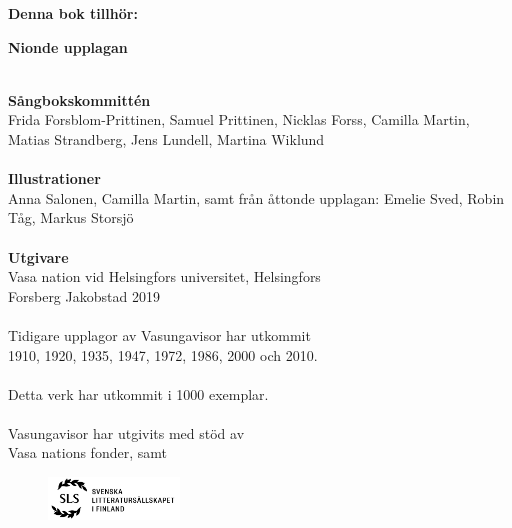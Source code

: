 
\begin{small}
\begin{center}
	\textbf{Denna bok tillhör:}
\end{center}
\end{small}
\vspace{0.5cm}
\hrulefill
\newpage
\begin{scriptsize}
\begin{center}
\textbf{Nionde upplagan}
~\\
~\\
{
\textbf{Sångbokskommittén}
~\\
Frida Forsblom-Prittinen, Samuel Prittinen, 
Nicklas Forss, Camilla Martin, Matias Strandberg,
Jens Lundell, Martina Wiklund
~\\
~\\
\textbf{Illustrationer}
~\\
Anna Salonen, Camilla Martin, samt från åttonde upplagan: Emelie Sved, Robin Tåg, Markus Storsjö
~\\
~\\
\textbf{Utgivare}
~\\
Vasa nation vid Helsingfors universitet, Helsingfors ~\\
Forsberg Jakobstad 2019
~\\
~\\
Tidigare upplagor av Vasungavisor har utkommit ~\\
1910, 1920, 1935, 1947, 1972, 1986, 2000 och 2010.
~\\
~\\
Detta verk har utkommit i 1000 exemplar.
~\\
~\\
Vasungavisor har utgivits med stöd av
~\\
Vasa nations fonder, samt
\begin{figure}[h!]
	\begin{center}
		\includegraphics[width=35mm]{SLS_logo.png}
	\end{center}
\end{figure}
}
\end{center}
\end{scriptsize}

\clearpage